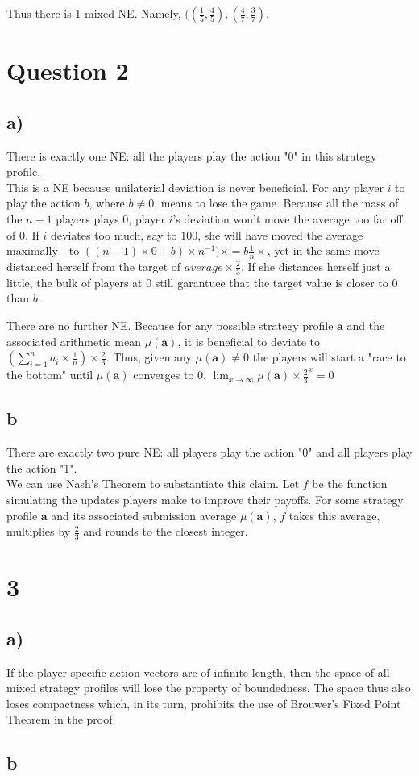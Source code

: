 \documentclass[10pt,a4paper]{article}
\begin{document}
Thus there is 1 mixed NE. Namely, $((\tfrac{1}{5},\tfrac{4}{5}),(\tfrac{4}{7},\tfrac{3}{7})$.
\section*{Question 2}
\subsection*{a)}
There is exactly one NE: all the players play the action "0" in this strategy profile.\\
This is a NE because unilaterial deviation is never beneficial. For any player $i$ to play the action $b$, where $b\neq 0$, means to lose the game. Because all the mass of the $n-1$ players plays $0$, player $i$'s deviation won't move the average too far off of $0$. If $i$ deviates too much, say to $100$, she will have moved the average maximally - to $((n-1)\times 0 + b)\times n^{-1})\times=b \tfrac{1}{n}\times$, yet in the same move distanced herself from the target of $average \times \tfrac{2}{3}$. If she distances herself just a little, the bulk of players at $0$ still garantuee that the target value is closer to $0$ than $b$.

There are no further NE. Because for any possible strategy profile $\textbf{a}$ and the associated arithmetic mean $\mu(\textbf{a})$, it is beneficial to deviate to $(\sum^n_{i=1} a_i \times \tfrac{1}{n})\times \tfrac{2}{3}$. Thus, given any $\mu(\textbf{a})\neq 0$ the players will start a "race to the bottom" until $\mu(\textbf{a})$ converges to $0$. $\lim_{x\rightarrow \infty} \mu(\textbf{a})\times \tfrac{2}{3}^x=0$
\subsection*{b}
There are exactly two pure NE: all players play the action "0" and all players play the action "1". \\
We can use Nash's Theorem to substantiate this claim. Let $f$ be the function simulating the updates players make to improve their payoffs. For some strategy profile $\textbf{a}$ and its associated submission average $\mu(\textbf{a})$, $f$ takes this average, multiplies by $\tfrac{2}{3}$ and rounds to the closest integer.

\section*{3}
\subsection*{a)}
If the player-specific action vectors are of infinite length, then the space of all mixed strategy profiles will lose the property of boundedness. The space thus also loses compactness which, in its turn, prohibits the use of Brouwer's Fixed Point Theorem in the proof.

\subsection*{b}
\end{document}
